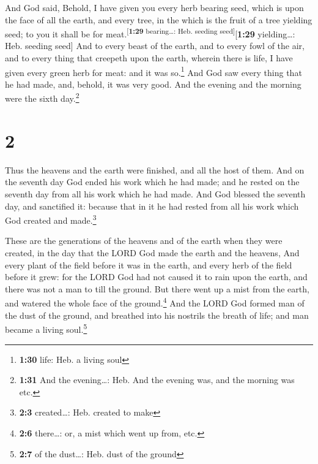  And God said, Behold, I have given you every herb
bearing seed, which is upon the face of all the earth, and every tree,
in the which is the fruit of a tree yielding seed; to you it shall be
for meat.\textsuperscript{{[}\textbf{1:29} bearing\ldots: Heb. seeding
seed{]}}{[}\textbf{1:29} yielding\ldots: Heb. seeding seed{]}
 And to every beast of the earth, and to every fowl of
the air, and to every thing that creepeth upon the earth, wherein there
is life, I have given every green herb for meat: and it was
so.\footnote{\textbf{1:30} life: Heb. a living soul}  And
God saw every thing that he had made, and, behold, it was very good. And
the evening and the morning were the sixth day.\footnote{\textbf{1:31}
  And the evening\ldots: Heb. And the evening was, and the morning was
  etc.}

\hypertarget{section-1}{%
\section{2}\label{section-1}}

 Thus the heavens and the earth were finished, and all the
host of them.  And on the seventh day God ended his work
which he had made; and he rested on the seventh day from all his work
which he had made.  And God blessed the seventh day, and
sanctified it: because that in it he had rested from all his work which
God created and made.\footnote{\textbf{2:3} created\ldots: Heb. created
  to make}

 These are the generations of the heavens and of the earth
when they were created, in the day that the LORD God made the earth and
the heavens,  And every plant of the field before it was
in the earth, and every herb of the field before it grew: for the LORD
God had not caused it to rain upon the earth, and there was not a man to
till the ground.  But there went up a mist from the earth,
and watered the whole face of the ground.\footnote{\textbf{2:6}
  there\ldots: or, a mist which went up from, etc.}  And
the LORD God formed man of the dust of the ground, and breathed into his
nostrils the breath of life; and man became a living soul.\footnote{\textbf{2:7}
  of the dust\ldots: Heb. dust of the ground}

